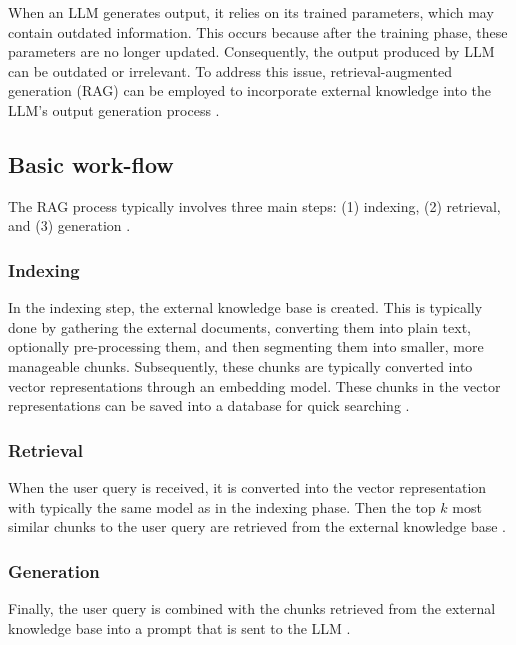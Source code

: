 When an LLM generates output, it relies on its trained parameters, which may contain outdated information. This occurs because after the training phase, these parameters are no longer updated. Consequently, the output produced by LLM can be outdated or irrelevant. To address this issue, retrieval-augmented generation (RAG) can be employed to incorporate external knowledge into the LLM's output generation process \cite{Gao2023}.



\subsection{Basic work-flow}

The RAG process typically involves three main steps: (1) indexing, (2) retrieval, and (3) generation \cite{Gao2023}.


\subsubsection{Indexing}

In the indexing step, the external knowledge base is created. This is typically done by gathering the external documents, converting them into plain text, optionally pre-processing them, and then segmenting them into smaller, more manageable chunks. Subsequently, these chunks are typically converted into vector representations through an embedding model. These chunks in the vector representations can be saved into a database for quick searching \cite{Gao2023}.


\subsubsection{Retrieval}

When the user query is received, it is converted into the vector representation with typically the same model as in the indexing phase. Then the top $k$ most similar chunks to the user query are retrieved from the external knowledge base \cite{Gao2023}.


\subsubsection{Generation}

Finally, the user query is combined with the chunks retrieved from the external knowledge base into a prompt that is sent to the LLM \cite{Gao2023}.


